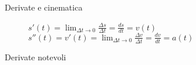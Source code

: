 \documentclass[a4paper,11pt,italian]{article}
\begin{document}
\begin{description}
%   
%   
%   
%   
  
  \item[Derivate e cinematica] $ s'(t) = \displaystyle \lim_{\Delta t \to 0} \frac{\Delta s}{\Delta t} = \frac{ds}{dt} = v(t) $~~~~~~~~~~~$ s''(t) = v'(t) = \displaystyle \lim_{\Delta t \to 0} \frac{\Delta v}{\Delta t} = \frac{dv}{dt} = a(t) $
  
  
  \item[Derivate notevoli] ~
  

\end{description}
\end{document}
